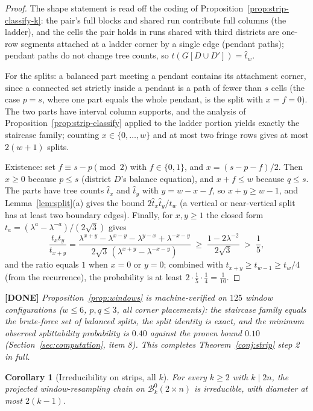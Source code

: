 \documentclass[11pt]{article}
\newcommand{\done}[1]{\medskip\noindent\textcolor{donecol}{\textbf{[DONE]} \emph{#1}}\medskip}
\newcommand{\Bcal}{\mathcal{B}}
\newtheorem{corollary}[theorem]{Corollary}
\begin{document}
\begin{proof}
The shape statement is read off the coding of
Proposition~\ref{prop:strip-classify-k}: the pair's full blocks and
shared run contribute full columns (the ladder), and the cells the pair
holds in runs shared with third districts are one-row segments attached
at a ladder corner by a single edge (pendant paths); pendant paths do
not change tree counts, so $t(G[D \cup D']) = \hat t_w$.

For the splits: a balanced part meeting a pendant contains its
attachment corner, since a connected set strictly inside a pendant is a
path of fewer than $s$ cells (the case $p = s$, where one part equals
the whole pendant, is the split with $x = f = 0$). The two parts have
interval column supports, and the analysis of
Proposition~\ref{prop:strip-classify} applied to the ladder portion
yields exactly the staircase family; counting $x \in \{0, \ldots, w\}$
and at most two fringe rows gives at most $2(w+1)$ splits.

Existence: set $f \equiv s - p \pmod 2$ with $f \in \{0, 1\}$, and
$x = (s - p - f)/2$. Then $x \ge 0$ because $p \le s$ (district $D$'s
balance equation), and $x + f \le w$ because $q \le s$. The parts have
tree counts $\hat t_x$ and $\hat t_y$ with $y = w - x - f$, so
$x + y \ge w - 1$, and Lemma~\ref{lem:split}(a) gives the bound
$2 \hat t_x \hat t_y / t_w$ (a vertical or near-vertical split has at
least two boundary edges). Finally, for $x, y \ge 1$ the closed form
$t_a = (\lambda^a - \lambda^{-a})/(2\sqrt3)$ gives
\[
  \frac{t_x t_y}{t_{x+y}}
  = \frac{\lambda^{x+y} - \lambda^{x-y} - \lambda^{y-x} +
      \lambda^{-x-y}}{2\sqrt3\,(\lambda^{x+y} - \lambda^{-x-y})}
  \;\ge\; \frac{1 - 2\lambda^{-2}}{2\sqrt3} \;>\; \frac15,
\]
and the ratio equals $1$ when $x = 0$ or $y = 0$; combined with
$t_{x+y} \ge t_{w-1} \ge t_w/4$ (from the recurrence), the probability
is at least $2 \cdot \frac15 \cdot \frac14 = \frac1{10}$.
\end{proof}

\done{Proposition~\ref{prop:windows} is machine-verified on $125$ window
configurations ($w \le 6$, $p, q \le 3$, all corner placements): the
staircase family equals the brute-force set of balanced splits, the
split identity is exact, and the minimum observed splittability
probability is $0.40$ against the proven bound $0.10$
(Section~\ref{sec:computation}, item 8). This completes
Theorem~\ref{conj:strip} step 2 in full.}

\begin{corollary}[Irreducibility on strips, all $k$]
\label{cor:strip-irred}
For every $k \ge 2$ with $k \mid 2n$, the projected
window-resampling chain on $\Bcal_k^0(2 \times n)$ is irreducible, with
diameter at most $2(k-1)$.
\end{corollary}
\end{document}

